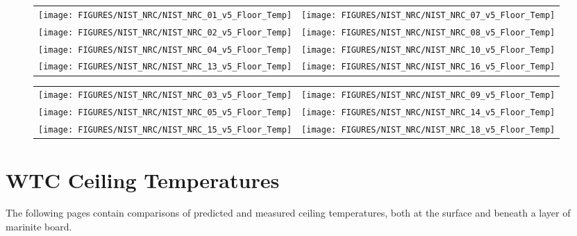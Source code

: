 \clearpage


\begin{figure}[h!]
\begin{tabular*}{\textwidth}{l@{\extracolsep{\fill}}r}
\texttt{[image: FIGURES/NIST\_NRC/NIST\_NRC\_01\_v5\_Floor\_Temp]} &
\texttt{[image: FIGURES/NIST\_NRC/NIST\_NRC\_07\_v5\_Floor\_Temp]} \\
\texttt{[image: FIGURES/NIST\_NRC/NIST\_NRC\_02\_v5\_Floor\_Temp]} &
\texttt{[image: FIGURES/NIST\_NRC/NIST\_NRC\_08\_v5\_Floor\_Temp]} \\
\texttt{[image: FIGURES/NIST\_NRC/NIST\_NRC\_04\_v5\_Floor\_Temp]} &
\texttt{[image: FIGURES/NIST\_NRC/NIST\_NRC\_10\_v5\_Floor\_Temp]} \\
\texttt{[image: FIGURES/NIST\_NRC/NIST\_NRC\_13\_v5\_Floor\_Temp]} &
\texttt{[image: FIGURES/NIST\_NRC/NIST\_NRC\_16\_v5\_Floor\_Temp]}
\end{tabular*}
\label{NIST_NRC_Floor_Temp_Closed}
\end{figure}

\begin{figure}[h!]
\begin{tabular*}{\textwidth}{l@{\extracolsep{\fill}}r}
\texttt{[image: FIGURES/NIST\_NRC/NIST\_NRC\_03\_v5\_Floor\_Temp]} &
\texttt{[image: FIGURES/NIST\_NRC/NIST\_NRC\_09\_v5\_Floor\_Temp]} \\
\texttt{[image: FIGURES/NIST\_NRC/NIST\_NRC\_05\_v5\_Floor\_Temp]} &
\texttt{[image: FIGURES/NIST\_NRC/NIST\_NRC\_14\_v5\_Floor\_Temp]} \\
\texttt{[image: FIGURES/NIST\_NRC/NIST\_NRC\_15\_v5\_Floor\_Temp]} &
\texttt{[image: FIGURES/NIST\_NRC/NIST\_NRC\_18\_v5\_Floor\_Temp]}
\end{tabular*}
\label{NIST_NRC_Floor_Temp_Open}
\end{figure}

\clearpage


\section{WTC Ceiling Temperatures}

The following pages contain comparisons of predicted and measured ceiling temperatures, both at the surface and beneath a layer of 
marinite board.

